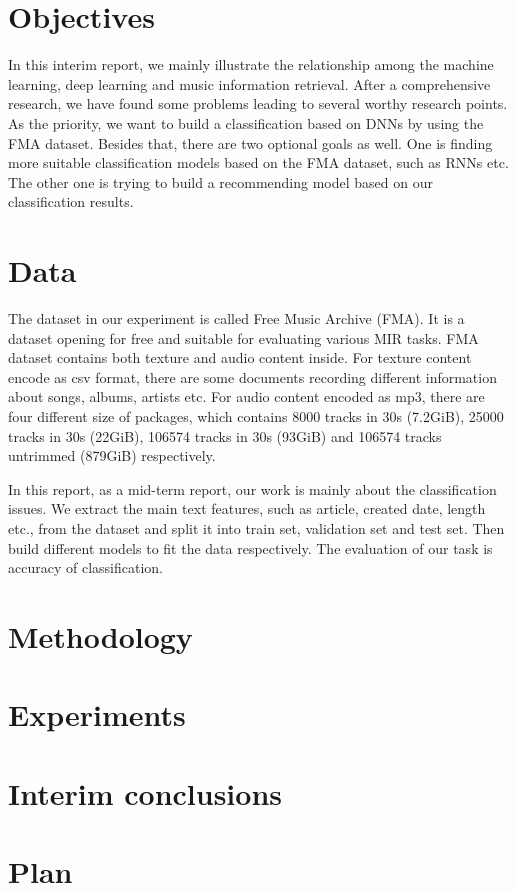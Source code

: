 \documentclass{article}
\begin{document}
\section{Objectives}
In this interim report, we mainly illustrate the relationship among the machine learning, deep learning and music information retrieval. After a comprehensive research, we have found some problems leading to several worthy research points. As the priority, we want to build a classification based on DNNs by using the FMA dataset. Besides that, there are two optional goals as well. One is finding more suitable classification models based on the FMA dataset, such as RNNs etc. The other one is trying to build a recommending model based on our classification results.




\section{Data}
The dataset in our experiment is called Free Music Archive (FMA). It is a dataset opening for free and suitable for evaluating various MIR tasks. FMA dataset contains both texture and audio content inside. For texture content encode as csv format, there are some documents recording different information about songs, albums, artists etc. For audio content encoded as mp3, there are four different size of packages, which contains 8000 tracks in 30s (7.2GiB), 25000 tracks in 30s (22GiB), 106574 tracks in 30s (93GiB) and 106574 tracks untrimmed (879GiB) respectively. 

In this report, as a mid-term report, our work is mainly about the classification issues. We extract the main text features, such as article, created date, length etc., from the dataset and split it into train set, validation set and test set. Then build different models to fit the data respectively. The evaluation of our task is accuracy of classification. 


\section{Methodology}


\section{Experiments}


\section{Interim conclusions}


\section{Plan}



\end{document}
